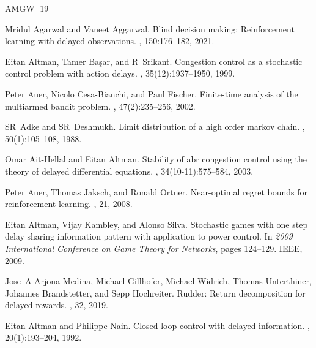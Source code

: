 \newcommand{\etalchar}[1]{$^{#1}$}
\begin{thebibliography}{AMGW{\etalchar{+}}19}

Mridul Agarwal and Vaneet Aggarwal.
\newblock Blind decision making: Reinforcement learning with delayed observations.
, 150:176--182, 2021.

Eitan Altman, Tamer Ba{\c{s}}ar, and R~Srikant.
\newblock Congestion control as a stochastic control problem with action delays.
, 35(12):1937--1950, 1999.

Peter Auer, Nicolo Cesa-Bianchi, and Paul Fischer.
\newblock Finite-time analysis of the multiarmed bandit problem.
, 47(2):235--256, 2002.

SR~Adke and SR~Deshmukh.
\newblock Limit distribution of a high order markov chain.
, 50(1):105--108, 1988.

Omar Ait-Hellal and Eitan Altman.
\newblock Stability of abr congestion control using the theory of delayed differential equations.
, 34(10-11):575--584, 2003.

Peter Auer, Thomas Jaksch, and Ronald Ortner.
\newblock Near-optimal regret bounds for reinforcement learning.
, 21, 2008.

Eitan Altman, Vijay Kambley, and Alonso Silva.
\newblock Stochastic games with one step delay sharing information pattern with application to power control.
\newblock In {\em 2009 International Conference on Game Theory for Networks}, pages 124--129. IEEE, 2009.

\bibitem[AMGW{\etalchar{+}}19]{arjona2019rudder}
Jose~A Arjona-Medina, Michael Gillhofer, Michael Widrich, Thomas Unterthiner, Johannes Brandstetter, and Sepp Hochreiter.
\newblock Rudder: Return decomposition for delayed rewards.
, 32, 2019.

Eitan Altman and Philippe Nain.
\newblock Closed-loop control with delayed information.
, 20(1):193--204, 1992.


\end{thebibliography}
